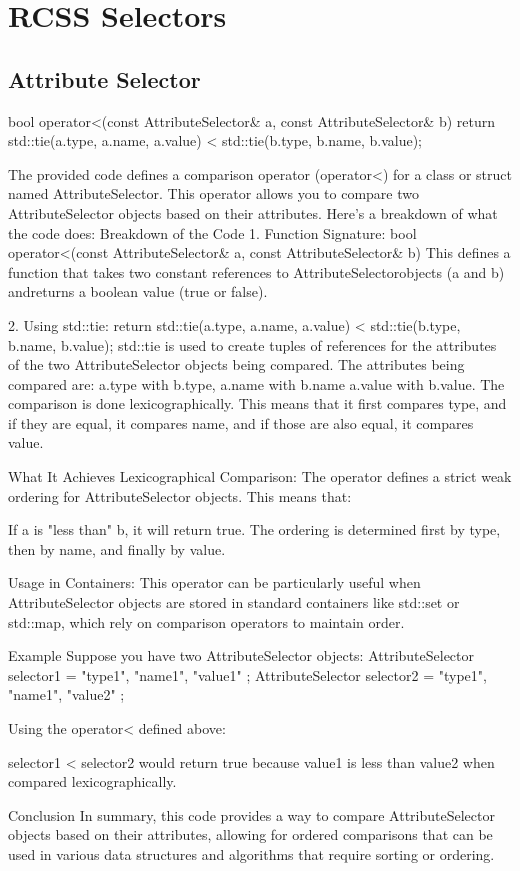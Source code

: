 \documentclass[11pt]{article}
\begin{document}
\section{RCSS Selectors}

\subsection{Attribute Selector}
bool operator<(const AttributeSelector& a, const AttributeSelector& b)
{
  return std::tie(a.type, a.name, a.value) < std::tie(b.type, b.name, b.value);
}

The provided code defines a comparison operator (operator<) for a class or struct named AttributeSelector. This operator allows you to compare two AttributeSelector objects based on their attributes. Here's a breakdown of what the code does:
Breakdown of the Code
1. Function Signature:
bool operator<(const AttributeSelector& a, const AttributeSelector& b)
This defines a function that takes two constant references to AttributeSelectorobjects (a and b) andreturns a boolean value (true or false).

2. Using std::tie:
return std::tie(a.type, a.name, a.value) < std::tie(b.type, b.name, b.value);
std::tie is used to create tuples of references for the attributes of the two AttributeSelector objects being compared. The attributes being compared are: a.type with b.type, a.name with b.name a.value with b.value. The comparison is done lexicographically. This means that it first compares type, and if they are equal, it compares name, and if those are also equal, it compares value.

What It Achieves
Lexicographical Comparison: The operator defines a strict weak ordering for AttributeSelector objects. This means that:

If a is "less than" b, it will return true. The ordering is determined first by type, then by name, and finally by value.

Usage in Containers: This operator can be particularly useful when AttributeSelector objects are stored in standard containers like std::set or std::map, which rely on comparison operators to maintain order.

Example
Suppose you have two AttributeSelector objects:
AttributeSelector selector1 = { "type1", "name1", "value1" };
AttributeSelector selector2 = { "type1", "name1", "value2" };

Using the operator< defined above:

selector1 < selector2 would return true because value1 is less than value2 when compared lexicographically.


Conclusion
In summary, this code provides a way to compare AttributeSelector objects based on their attributes, allowing for ordered comparisons that can be used in various data structures and algorithms that require sorting or ordering.
\end{document}
